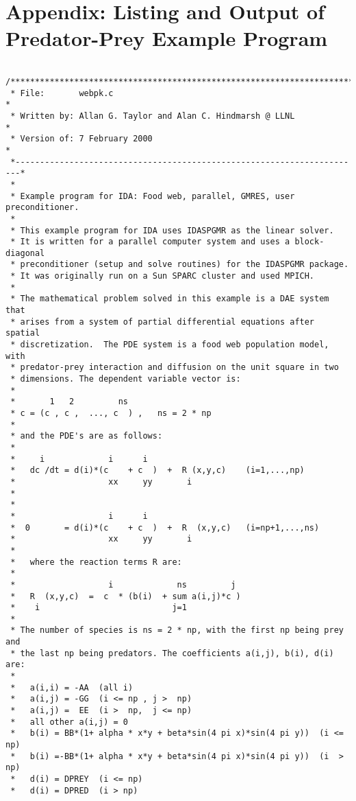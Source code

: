 \newpage

\section{Appendix: Listing and Output of Predator-Prey Example Program}

\small
\begin{verbatim}

/*************************************************************************
 * File:       webpk.c                                                   *
 * Written by: Allan G. Taylor and Alan C. Hindmarsh @ LLNL              *
 * Version of: 7 February 2000                                           *
 *-----------------------------------------------------------------------*
 *
 * Example program for IDA: Food web, parallel, GMRES, user preconditioner.
 *
 * This example program for IDA uses IDASPGMR as the linear solver.
 * It is written for a parallel computer system and uses a block-diagonal 
 * preconditioner (setup and solve routines) for the IDASPGMR package.
 * It was originally run on a Sun SPARC cluster and used MPICH.
 *                                         
 * The mathematical problem solved in this example is a DAE system that 
 * arises from a system of partial differential equations after spatial
 * discretization.  The PDE system is a food web population model, with
 * predator-prey interaction and diffusion on the unit square in two 
 * dimensions. The dependent variable vector is:
 *
 *       1   2         ns
 * c = (c , c ,  ..., c  ) ,   ns = 2 * np
 * 
 * and the PDE's are as follows:
 *
 *     i             i      i
 *   dc /dt = d(i)*(c    + c  )  +  R (x,y,c)    (i=1,...,np)
 *                   xx     yy       i
 *
 *
 *                   i      i      
 *  0       = d(i)*(c    + c  )  +  R  (x,y,c)   (i=np+1,...,ns)
 *                   xx     yy       i
 *
 *   where the reaction terms R are:
 *
 *                   i             ns         j  
 *   R  (x,y,c)  =  c  * (b(i)  + sum a(i,j)*c )
 *    i                           j=1
 *
 * The number of species is ns = 2 * np, with the first np being prey and
 * the last np being predators. The coefficients a(i,j), b(i), d(i) are:
 *
 *   a(i,i) = -AA  (all i)
 *   a(i,j) = -GG  (i <= np , j >  np)
 *   a(i,j) =  EE  (i >  np,  j <= np)
 *   all other a(i,j) = 0
 *   b(i) = BB*(1+ alpha * x*y + beta*sin(4 pi x)*sin(4 pi y))  (i <= np)
 *   b(i) =-BB*(1+ alpha * x*y + beta*sin(4 pi x)*sin(4 pi y))  (i  > np)
 *   d(i) = DPREY  (i <= np)
 *   d(i) = DPRED  (i > np)

\end{verbatim}
